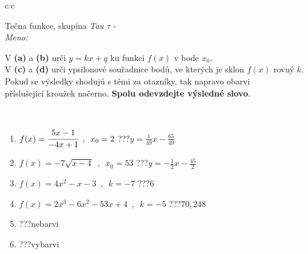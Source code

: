 \documentclass[10pt]{report}
\begin{document}
\newpage
\thispagestyle{empty}
\begin{tabular}{c:c}
\begin{minipage}[c][104.5mm][t]{0.5\linewidth}
\begin{center}
\vspace{7mm}
{\huge Tečna funkce, skupina \textit{Tau $\tau$} -}\\[5mm]
\textit{Meno:}\phantom{xxxxxxxxxxxxxxxxxxxxxxxxxxxxxxxxxxxxxxxxxxxxxxxxxxxxxxxxxxxxxxxxx}\\[5mm]
\begin{minipage}{0.95\linewidth}
\begin{center}
V \textbf{(a)} a \textbf{(b)} urči  $y = kx + q$ ku funkci $f(x)$ v bode $x_0$.\\V \textbf{(c)} a \textbf{(d)} urči ypsilonové souřadnice bodů, ve kterých je sklon $f(x)$ rovný $k$.\\Pokud se výsledky shodujú s těmi za otazníky, tak napravo obarvi\\příslušející kroužek načerno. \textbf{Spolu odevzdejte výsledné slovo}.
\end{center}
\end{minipage}
\\[1mm]
\begin{minipage}{0.79\linewidth}
\begin{center}
\begin{varwidth}{\linewidth}
\begin{enumerate}
\small
\item $f(x)=\cfrac{5x-1}{-4x+1}\enspace , \enspace x_0=2$\quad \dotfill\; ???\;\dotfill \quad $y = \frac{1}{49}x-\frac{65}{49}$
\item $f(x)=-7\sqrt{x-4}\enspace , \enspace x_0=53$\quad \dotfill\; ???\;\dotfill \quad $y = -\frac{1}{2}x-\frac{45}{2}$
\item $f(x)=4x^2-x-3\enspace , \enspace k=-7$\quad \dotfill\; ???\;\dotfill \quad $6$
\item $f(x)=2x^3-6x^2-53x+4\enspace , \enspace k=-5$\quad \dotfill\; ???\;\dotfill \quad $70 , 248$
\item \quad \dotfill\; ???\;\dotfill \quad nebarvi
\item \quad \dotfill\; ???\;\dotfill \quad vybarvi
\end{enumerate}
\end{varwidth}
\end{center}
\end{minipage}
\begin{minipage}{0.20\linewidth}

\end{minipage}
\end{center}
\end{minipage}
\end{tabular}
\end{document}
